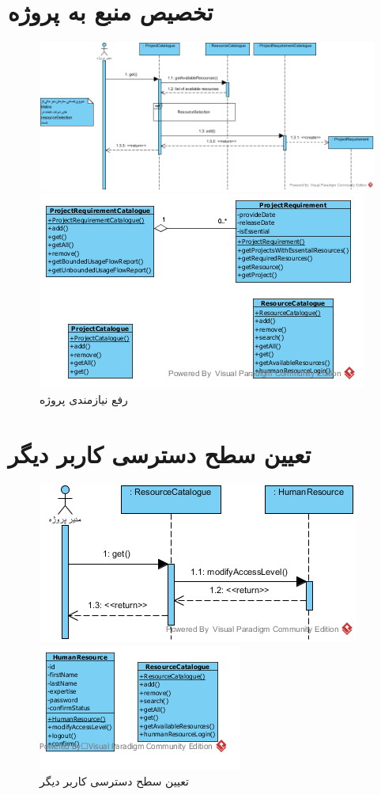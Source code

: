 \section{تخصیص منبع به پروژه}
\begin{figure}[H]
	\centering
	\includegraphics[scale=0.55]{img/sequence-analysis/AllocateResourceToProject}
	
	
	\includegraphics[scale=0.55]{img/sequence-analysis/AllocateResourceToProjectC}
	\caption{رفع نیازمندی پروژه}
\end{figure}

\section{تعیین سطح دسترسی کاربر دیگر}
\begin{figure}[H]
	\centering
	\includegraphics[scale=0.8]{img/sequence-analysis/SetUserAccessLevel}
	
	
	\includegraphics[scale=0.8]{img/sequence-analysis/SetUserAccessLevelC}
		\caption{تعیین سطح دسترسی کاربر دیگر}
\end{figure}


